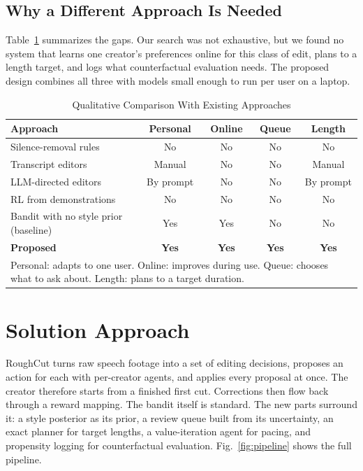 \documentclass{ieeeaccess}
\begin{document}
\subsection{Why a Different Approach Is Needed}
Table~\ref{tab:qualitative} summarizes the gaps. Our search was not exhaustive, but we found no system that learns one creator's preferences online for this class of edit, plans to a length target, and logs what counterfactual evaluation needs. The proposed design combines all three with models small enough to run per user on a laptop.

\begin{table}[t]
\caption{Qualitative Comparison With Existing Approaches}
\label{tab:qualitative}
\setlength{\tabcolsep}{2.5pt}
\centering
\begin{tabular}{|p{33mm}|c|c|c|c|}
\hline
Approach & Personal & Online & Queue & Length \\
\hline
Silence-removal rules & No & No & No & No \\
Transcript editors \cite{berthouzoz2012,rubin2013} & Manual & No & No & Manual \\
LLM-directed editors \cite{wang2024lave,huh2025videodiff} & By prompt & No & No & By prompt \\
RL from demonstrations \cite{hu2023rlediting} & No & No & No & No \\
Bandit with no style prior (baseline) & Yes & Yes & No & No \\
\textbf{Proposed} & \textbf{Yes} & \textbf{Yes} & \textbf{Yes} & \textbf{Yes} \\
\hline
\multicolumn{5}{p{78mm}}{Personal: adapts to one user. Online: improves during use. Queue: chooses what to ask about. Length: plans to a target duration.}
\end{tabular}
\end{table}

\section{Solution Approach}
\label{sec:method}

RoughCut turns raw speech footage into a set of editing decisions, proposes an action for each with per-creator agents, and applies every proposal at once. The creator therefore starts from a finished first cut. Corrections then flow back through a reward mapping. The bandit itself is standard. The new parts surround it: a style posterior as its prior, a review queue built from its uncertainty, an exact planner for target lengths, a value-iteration agent for pacing, and propensity logging for counterfactual evaluation. Fig.~\ref{fig:pipeline} shows the full pipeline.
\end{document}
